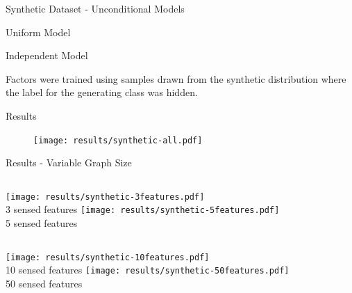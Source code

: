 \documentclass[compress]{beamer}
\begin{document}
\begin{frame}{Synthetic Dataset - Unconditional Models}

\begin{block}{Uniform Model}
\centering
{}
\end{block}

\begin{block}{Independent Model}
\centering
{}

Factors were trained using samples drawn from the synthetic distribution where the label
for the generating class was hidden.
\end{block}
\end{frame}

\begin{frame}{Results}
  \begin{figure}
    \texttt{[image: results/synthetic-all.pdf]}
  \end{figure}
\end{frame}

\begin{frame}{Results - Variable Graph Size}

\begin{columns}[c]
  \centering
  \texttt{[image: results/synthetic-3features.pdf]} \\ 3 sensed features
  \centering
  \texttt{[image: results/synthetic-5features.pdf]} \\ 5 sensed features
\end{columns}
\begin{columns}[c]
  \centering
  \texttt{[image: results/synthetic-10features.pdf]} \\ 10 sensed features
  \centering
  \texttt{[image: results/synthetic-50features.pdf]} \\ 50 sensed features
\end{columns}
\end{frame}
\end{document}
